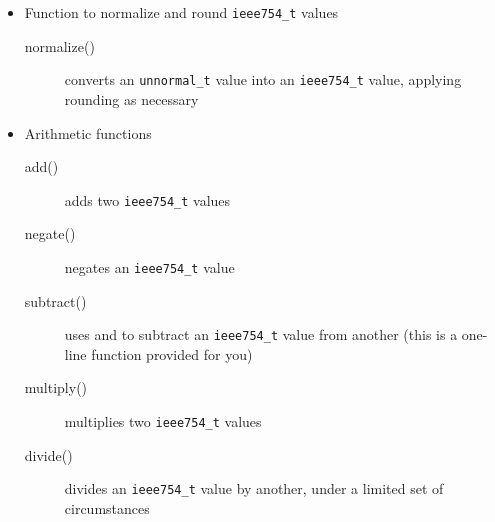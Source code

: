 \begin{itemize}
\begin{description}
    \end{description}
    \item Function to normalize and round \lstinline{ieee754_t} values
    \begin{description}
        \item[normalize()] converts an \lstinline{unnormal_t} value into an \lstinline{ieee754_t} value, applying rounding as necessary
    \end{description}
    \item Arithmetic functions
    \begin{description}
        \item[add()] adds two \lstinline{ieee754_t} values
        \item[negate()] negates an \lstinline{ieee754_t} value
        \item[subtract()] uses  and  to subtract an \lstinline{ieee754_t} value from another (this is a one-line function provided for you)
        \item[multiply()] multiplies two \lstinline{ieee754_t} values
        \item[divide()] divides an \lstinline{ieee754_t} value by another, under a limited set of circumstances
    \end{description}
\end{itemize}

